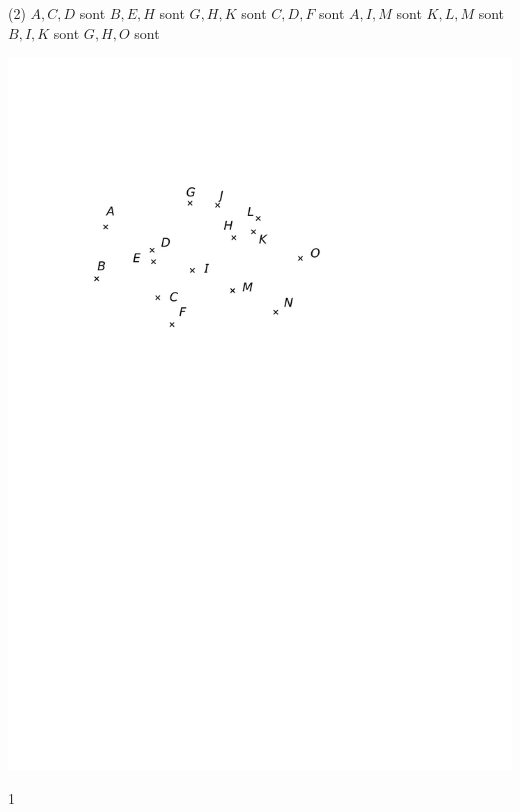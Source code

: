 \documentclass[a4paper,11pt]{report}
\begin{document}
\begin{exop}
{\begin{tasks}(2)
    \task $A, C, D$ sont 
    \task $B, E, H$ sont 
    \task $G, H, K$ sont 
    \task $C, D, F$ sont 
    \task $A, I, M$ sont 
    \task $K, L, M$ sont 
    \task $B, I, K$ sont 
    \task $G, H, O$ sont 
\end{tasks}
\begin{center}
	\includegraphics[scale=1]{media/es-11/13-3}
\end{center}
}
{1}
\end{exop}
\end{document}
